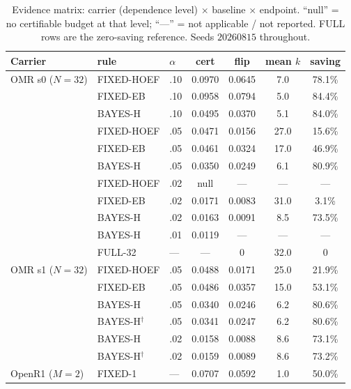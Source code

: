 \documentclass{article}
\theoremstyle{definition}
\theoremstyle{remark}
\begin{document}
\begin{table}[h]
\centering\small
\caption{Evidence matrix: carrier (dependence level) $\times$ baseline
$\times$ endpoint. ``null'' = no certifiable budget at that level;
``---'' = not applicable / not reported. FULL rows are the zero-saving
reference. Seeds $20260815$ throughout.}
\label{tab:matrix}
\begin{tabular}{lllcccc}
\toprule
Carrier & rule & $\alpha$ & cert & flip & mean $k$ & saving \\
\midrule
OMR s0 ($N{=}32$)   & FIXED-HOEF & .10 & 0.0970 & 0.0645 & 7.0 & 78.1\% \\
                    & FIXED-EB   & .10 & 0.0958 & 0.0794 & 5.0 & 84.4\% \\
                    & BAYES-H    & .10 & 0.0495 & 0.0370 & 5.1 & 84.0\% \\
                    & FIXED-HOEF & .05 & 0.0471 & 0.0156 & 27.0 & 15.6\% \\
                    & FIXED-EB   & .05 & 0.0461 & 0.0324 & 17.0 & 46.9\% \\
                    & BAYES-H    & .05 & 0.0350 & 0.0249 & 6.1 & 80.9\% \\
                    & FIXED-HOEF & .02 & null & --- & --- & --- \\
                    & FIXED-EB   & .02 & 0.0171 & 0.0083 & 31.0 & 3.1\% \\
                    & BAYES-H    & .02 & 0.0163 & 0.0091 & 8.5 & 73.5\% \\
                    & BAYES-H    & .01 & 0.0119 & --- & --- & --- \\
                    & FULL-32    & --- & --- & 0 & 32.0 & 0 \\
\midrule
OMR s1 ($N{=}32$)   & FIXED-HOEF & .05 & 0.0488 & 0.0171 & 25.0 & 21.9\% \\
                    & FIXED-EB   & .05 & 0.0486 & 0.0357 & 15.0 & 53.1\% \\
                    & BAYES-H    & .05 & 0.0340 & 0.0246 & 6.2 & 80.6\% \\
                    & BAYES-H$^\dagger$ & .05 & 0.0341 & 0.0247 & 6.2 & 80.6\% \\
                    & BAYES-H    & .02 & 0.0158 & 0.0088 & 8.6 & 73.1\% \\
                    & BAYES-H$^\dagger$ & .02 & 0.0159 & 0.0089 & 8.6 & 73.2\% \\
\midrule
OpenR1 ($M{=}2$)    & FIXED-1    & --- & 0.0707 & 0.0592 & 1.0 & 50.0\% \\

\end{tabular}
\end{table}
\end{document}
